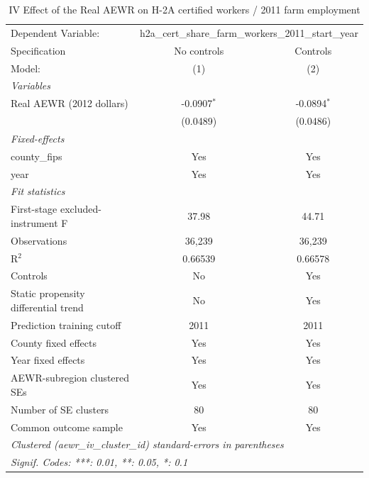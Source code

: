 
\begin{table}[htbp]
   \caption{\label{tab:iv_h2a_normalized} IV Effect of the Real AEWR on H-2A certified workers / 2011 farm employment}
   \centering
   \begin{tabular}{lcc}
      \tabularnewline \midrule \midrule
      Dependent Variable: & \multicolumn{2}{c}{h2a\_cert\_share\_farm\_workers\_2011\_start\_year}\\
      Specification                        & No controls   & Controls \\
      Model:                               & (1)           & (2)\\
      \midrule
      \emph{Variables}\\
      Real AEWR (2012 dollars)             & -0.0907$^{*}$ & -0.0894$^{*}$\\
                                           & (0.0489)      & (0.0486)\\
      \midrule
      \emph{Fixed-effects}\\
      county\_fips                         & Yes           & Yes\\
      year                                 & Yes           & Yes\\
      \midrule
      \emph{Fit statistics}\\
      First-stage excluded-instrument F    & 37.98         & 44.71\\
      Observations                         & 36,239        & 36,239\\
      R$^2$                                & 0.66539       & 0.66578\\
      Controls                             & No            & Yes\\
      Static propensity differential trend & No            & Yes\\
      Prediction training cutoff           & 2011          & 2011\\
      County fixed effects                 & Yes           & Yes\\
      Year fixed effects                   & Yes           & Yes\\
      AEWR-subregion clustered SEs         & Yes           & Yes\\
      Number of SE clusters                & 80            & 80\\
      Common outcome sample                & Yes           & Yes\\
      \midrule \midrule
      \multicolumn{3}{l}{\emph{Clustered (aewr\_iv\_cluster\_id) standard-errors in parentheses}}\\
      \multicolumn{3}{l}{\emph{Signif. Codes: ***: 0.01, **: 0.05, *: 0.1}}\\
   \end{tabular}


\end{table}
